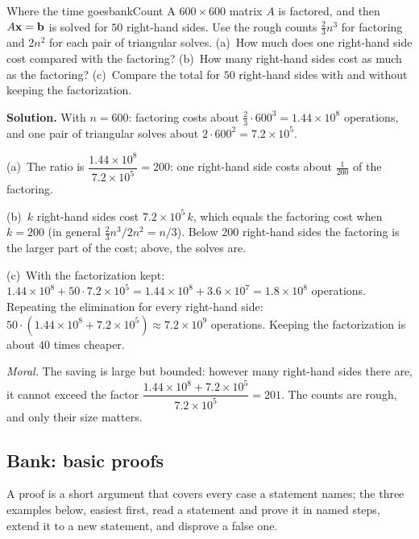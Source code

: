 \documentclass[11pt]{article}
\begin{document}
\begin{exmp}{Where the time goes}{bankCount}
A $600\times600$ matrix $A$ is factored, and then $A\mathbf{x}=\mathbf{b}$ is solved for $50$ right-hand sides. Use the rough counts $\tfrac23n^3$ for factoring and $2n^2$ for each pair of triangular solves. (a)~How much does one right-hand side cost compared with the factoring? (b)~How many right-hand sides cost as much as the factoring? (c)~Compare the total for $50$ right-hand sides with and without keeping the factorization.

\textbf{Solution.} With $n=600$: factoring costs about $\tfrac23\cdot600^3=1.44\times10^8$ operations, and one pair of triangular solves about $2\cdot600^2=7.2\times10^5$.

(a)~The ratio is $\dfrac{1.44\times10^8}{7.2\times10^5}=200$: one right-hand side costs about $\tfrac1{200}$ of the factoring.

(b)~$k$ right-hand sides cost $7.2\times10^5\,k$, which equals the factoring cost when $k=200$ (in general $\tfrac23n^3\big/2n^2=n/3$). Below $200$ right-hand sides the factoring is the larger part of the cost; above, the solves are.

(c)~With the factorization kept: $1.44\times10^8+50\cdot7.2\times10^5=1.44\times10^8+3.6\times10^7=1.8\times10^8$ operations. Repeating the elimination for every right-hand side: $50\cdot(1.44\times10^8+7.2\times10^5)\approx7.2\times10^9$ operations. Keeping the factorization is about $40$ times cheaper.

\emph{Moral.} The saving is large but bounded: however many right-hand sides there are, it cannot exceed the factor $\dfrac{1.44\times10^8+7.2\times10^5}{7.2\times10^5}=201$. The counts are rough, and only their size matters.
\end{exmp}

\subsection*{Bank: basic proofs}

A proof is a short argument that covers every case a statement names; the three examples below, easiest first, read a statement and prove it in named steps, extend it to a new statement, and disprove a false one.
\end{document}
